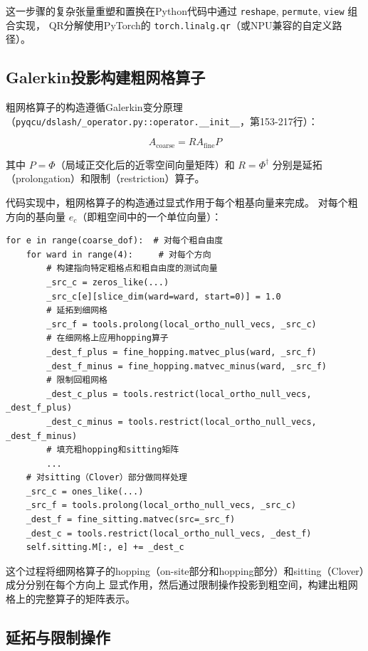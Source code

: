 \documentclass[11pt,a4paper]{article}
\begin{document}
这一步骤的复杂张量重塑和置换在Python代码中通过 \texttt{reshape}, \texttt{permute}, \texttt{view} 组合实现，
QR分解使用PyTorch的 \texttt{torch.linalg.qr}（或NPU兼容的自定义路径）。

\subsection{Galerkin投影构建粗网格算子}

粗网格算子的构造遵循Galerkin变分原理（\texttt{pyqcu/dslash/\_operator.py::operator.\_\_init\_\_}，第153-217行）：

\begin{equation}
A_{\text{coarse}} = R A_{\text{fine}} P
\end{equation}

其中 $P = \Phi$（局域正交化后的近零空间向量矩阵）和 $R = \Phi^\dagger$ 分别是延拓（prolongation）和限制（restriction）算子。

代码实现中，粗网格算子的构造通过显式作用于每个粗基向量来完成。
对每个粗方向的基向量 $e_c$（即粗空间中的一个单位向量）：

\begin{lstlisting}[style=pythonstyle]
for e in range(coarse_dof):  # 对每个粗自由度
    for ward in range(4):     # 对每个方向
        # 构建指向特定粗格点和粗自由度的测试向量
        _src_c = zeros_like(...)
        _src_c[e][slice_dim(ward=ward, start=0)] = 1.0
        # 延拓到细网格
        _src_f = tools.prolong(local_ortho_null_vecs, _src_c)
        # 在细网格上应用hopping算子
        _dest_f_plus = fine_hopping.matvec_plus(ward, _src_f)
        _dest_f_minus = fine_hopping.matvec_minus(ward, _src_f)
        # 限制回粗网格
        _dest_c_plus = tools.restrict(local_ortho_null_vecs, _dest_f_plus)
        _dest_c_minus = tools.restrict(local_ortho_null_vecs, _dest_f_minus)
        # 填充粗hopping和sitting矩阵
        ...
    # 对sitting（Clover）部分做同样处理
    _src_c = ones_like(...)
    _src_f = tools.prolong(local_ortho_null_vecs, _src_c)
    _dest_f = fine_sitting.matvec(src=_src_f)
    _dest_c = tools.restrict(local_ortho_null_vecs, _dest_f)
    self.sitting.M[:, e] += _dest_c
\end{lstlisting}

这个过程将细网格算子的hopping（on-site部分和hopping部分）和sitting（Clover）成分分别在每个方向上
显式作用，然后通过限制操作投影到粗空间，构建出粗网格上的完整算子的矩阵表示。

\subsection{延拓与限制操作}
\end{document}
